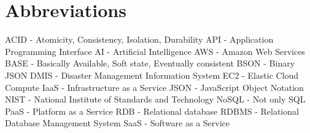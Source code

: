 \chapter{Abbreviations}

ACID - Atomicity, Consistency, Isolation, Durability
\newline
API - Application Programming Interface
\newline
AI - Artificial Intelligence
\newline
AWS - Amazon Web Services
\newline
BASE - Basically Available, Soft state, Eventually consistent
\newline
BSON - Binary JSON
\newline
DMIS - Disaster Management Information System
\newline
EC2 - Elastic Cloud Compute
\newline
IaaS - Infrastructure as a Service
\newline
JSON - JavaScript Object Notation
\newline
NIST - National Institute of Standards and Technology
\newline
NoSQL - Not only SQL
\newline
PaaS - Platform as a Service
\newline
RDB - Relational database
\newline
RDBMS - Relational Database Management System
\newline
SaaS 
- Software as a Service

\clearpage
\newpage

